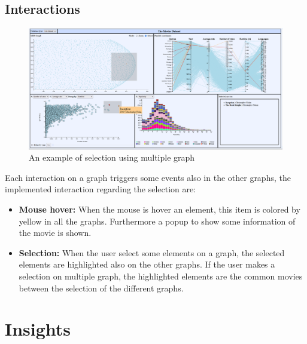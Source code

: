 \documentclass[]{article}
\begin{document}
\subsection{Interactions}
\begin{figure}[H]
	\centering
	\includegraphics[width=1\linewidth]{images/interaction1}
	\caption[Interaction example]{An example of selection using multiple graph}
	\label{fig:interaction1}
\end{figure}
Each interaction on a graph triggers some events also in the other graphs, the implemented interaction regarding the selection are:
\begin{itemize}
	\item \textbf{Mouse hover:} When the mouse is hover an element, this item is colored by yellow in all the graphs. Furthermore a popup to show some information of the movie is shown.
	\item \textbf{Selection:} When the user select some elements on a graph, the selected elements are highlighted also on the other graphs. If the user makes a selection on multiple graph, the highlighted elements are the common movies between the selection of the different graphs.
\end{itemize}
\section{Insights}
\end{document}
